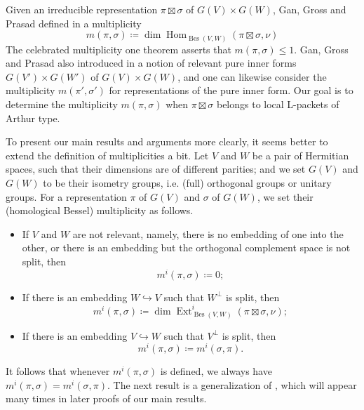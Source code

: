 \documentclass[11pt,letterpaper]{amsart}
\theoremstyle{plain}
\newcounter{theorem}[section]
\numberwithin{theorem}{section}
\numberwithin{equation}{subsection}
\theoremstyle{remark}
\newcommand{\Hom}{\operatorname{Hom}}
\newcommand{\Ext}{\operatorname{Ext}}
\newcommand{\Bes}{\operatorname{Bes}} %
\begin{document}
Given an irreducible representation $\pi \boxtimes \sigma$ of $G\left(V\right) \times G\left(W\right)$, Gan, Gross and Prasad defined in \cite[Sect. 12]{MR3202556} a multiplicity
 \[
    m\left(\pi,\sigma\right) \coloneqq  \dim \Hom_{\Bes(V,W)}\left(\pi\boxtimes \sigma,\nu\right)
 \]
The celebrated multiplicity one theorem \cite{MR2529937, MR2680495, MR2874638} asserts that $m\left(\pi,\sigma\right)\leq 1$. 
Gan, Gross and Prasad also introduced in \cite[Sect. 2]{MR3202556} a notion of relevant pure inner forms $G\left(V'\right) \times G\left(W'\right)$ of $G(V) \times G(W)$, and one can likewise consider the multiplicity $m\left(\pi',\sigma'\right)$ for representations of the pure inner form. Our goal is to determine the multiplicity $m\left(\pi,\sigma\right)$ when $\pi \boxtimes \sigma$ belongs to local L-packets of Arthur type. 

\vskip 5pt

To present our main results and arguments more clearly, it seems better to extend the definition of multiplicities a bit. Let $V$ and $W$ be a pair of Hermitian spaces, such that their dimensions are of different parities; and we set $G\left(V\right)$ and $G\left(W\right)$ to be their isometry groups, i.e. (full) orthogonal groups or unitary groups.
For a representation $\pi$ of $G\left(V\right)$ and $\sigma$ of $G\left(W\right)$, we set their (homological Bessel) multiplicity as follows.
\begin{itemize}
    \item If $V$ and $W$ are not relevant, namely, there is no embedding of one into the other, or there is an embedding but the orthogonal complement space is not split, then
    \[
        m^i\left(\pi,\sigma\right) \coloneqq 0;
    \]

    \vskip 5pt

    \item If there is an embedding $W\hookrightarrow V$ such that $W^\perp$ is split, then
    \[
        m^i(\pi,\sigma)\coloneqq \dim \Ext^i_{\Bes(V,W)}(\pi\boxtimes \sigma,\nu);
    \]

    \vskip 5pt

    \item If there is an embedding $V\hookrightarrow W$ such that $V^\perp$ is split, then
    \[
        m^i(\pi,\sigma)\coloneqq m^i(\sigma,\pi).
    \]
\end{itemize}
\vskip 5pt
It follows that whenever $m^i(\pi,\sigma)$ is defined, we always have $m^i(\pi,\sigma) = m^i(\sigma,\pi)$. The next result is a generalization of \cite[Thm. 15.1]{MR3202556}, which will appear many times in later proofs of our main results.
\end{document}
